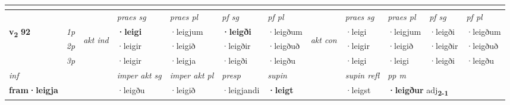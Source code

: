 \begin{longtable}[l]{X>{\footnotesize\itshape}llXXXXlXXXX}
  & \\
   \midrule
 & &   & \textit{praes sg}  & \textit{praes pl}    & \textit{ pf sg} & \textit{pf pl} & & \textit{praes sg}  & \textit{praes pl}    & \textit{pf sg} & \textit{pf pl }  \\ \cmidrule{4-7} \cmidrule{9-12}
 \multirow{2}{*}{{{\textbf{v{\textsubscript{2}}} \Large{\textbf{92}}}}}  & 1p & \multirow{3}{*}{\begin{turn}{90}\textit{akt ind}\end{turn}} & \textbf{·leigi} & ·leigjum & \textbf{·leigði} & ·leigðum & \multirow{3}{*}{\begin{turn}{90}\textit{akt con}\end{turn}} &·leigi & ·leigjum & ·leigði & ·leigðum\\*
 & 2p &  &  ·leigir  & ·leigið & ·leigðir & ·leigðuð & & ·leigir & ·leigið & ·leigðir & ·leigðuð \\*
 & 3p &  & ·leigir & ·leigja & ·leigði & ·leigðu & & ·leigi & ·leigi& ·leigði & ·leigðu \\*
\cmidrule{4-7} \cmidrule{9-12}

   {\textit{inf}} & &  & \textit{imper akt sg} & \textit{imper akt pl}   & \textit{presp} & \textit{supin} && \textit{supin refl} & \textit{pp m} \\*
  {\textbf{fram\allowbreak ·leigja}} & && ·leigðu  & ·leigið   & ·leigjandi &  \textbf{·leigt} && ·leigst & \multicolumn{2}{l}{\textbf{·leigður} adj\textbf{\textsubscript{2-1}}} \\*

\midrule


\end{longtable}
